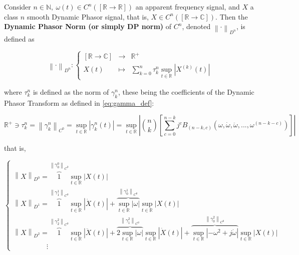 \begin{definition}\label{def:dpnorm} %

	Consider $n\in\mathbb{N},\ \omega(t)\in C^n\left(\left[\mathbb{R}\to\mathbb{R}\right]\right)$ an apparent frequency signal, and $X$ a class $n$ smooth Dynamic Phasor signal, that is, $X\in C^n\left(\left[\mathbb{R}\to\mathbb{C}\right]\right)$. Then the \textbf{Dynamic Phasor Norm (or simply DP norm)} of $C^n$, denoted $\left\lVert \cdot \right\rVert_{D^n}$, is defined as

\begin{equation} \left\lVert \cdot\right\rVert_{{D}^n}:\left\{\begin{array}{rcl} \left[\mathbb{R}\to\mathbb{C}\right] &\to& \mathbb{R}^+ \\[5mm] X(t) &\mapsto& \displaystyle\sum\limits_{k=0}^n \tau_k^n \sup\limits_{t\in\mathbb{R}} \left\lvert X^{(k)}(t)\right\rvert \end{array}\right. \label{eq:def_dpnorm}\end{equation}

	\noindent where $\tau_k^n$ is defined as the norm of $\gamma_k^n$, these being the coefficients of the Dynamic Phasor Transform as defined in \eqref{eq:gamma_def}:

\begin{equation} \mathbb{R}^+ \ni \tau_k^n = \left\lVert \gamma_k^n\right\rVert_{C^0} = \sup\limits_{t\in\mathbb{R}} \left\lvert\gamma_k^n(t) \right\rvert = \sup\limits_{t\in\mathbb{R}} \left\lvert {n\choose k} \left[\sum\limits_{c=0}^{n-k} j^cB_{\left(n-k,c\right)}\left(\omega,\dot{\omega},\ddot{\omega},...,\omega^{(n-k-c)}\right) \right] \right\rvert \end{equation}

	\noindent that is,

\begin{equation}
	\left\{\begin{array}{l}
		\left\lVert X\right\rVert_{D^0} = \overbrace{1}^{\left\lVert \gamma_0^0\right\rVert_{C^0}}\sup\limits_{t\in\mathbb{R}} \left\lvert X(t)\right\rvert \\[5mm]
		\left\lVert X\right\rVert_{D^1} = \overbrace{1}^{\left\lVert \gamma_1^1\right\rVert_{C^0}}\sup\limits_{t\in\mathbb{R}} \left\lvert \dot{X}(t)\right\rvert + \overbrace{\sup\limits_{t\in\mathbb{R}} \left\lvert\omega\right\rvert}^{\left\lVert \gamma_0^1\right\rVert_{C^0}} \sup\limits_{t\in\mathbb{R}} \left\lvert X(t)\right\rvert \\[5mm]
		\left\lVert X\right\rVert_{D^2} = \overbrace{1}^{\left\lVert \gamma_2^2\right\rVert_{C^0}} \sup\limits_{t\in\mathbb{R}}\left\lvert \ddot{X}(t)\right\rvert + \overbrace{2\sup\limits_{t\in\mathbb{R}}\left\lvert \omega \right\rvert}^{\left\lVert \gamma_1^2\right\rVert_{C^0}} \sup\limits_{t\in\mathbb{R}}\left\lvert \dot{X}(t)\right\rvert + \overbrace{\sup\limits_{t\in\mathbb{R}} \left\lvert -\omega^2 + j\dot{\omega}\right\rvert}^{\left\lVert \gamma_0^2\right\rVert_{C^0}} \sup\limits_{t\in\mathbb{R}}\left\lvert X(t)\right\rvert \\[5mm]
		\hspace{2cm} \vdots
	\end{array}\right.
\end{equation}


\end{definition}
